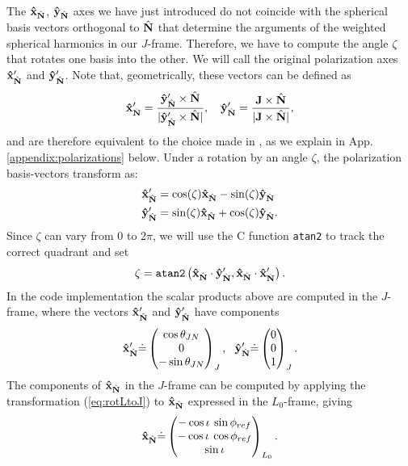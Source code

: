 \documentclass[%
aps,
prd,
amssymb,
amsmath,
amsfonts,
eqsecnum,
showpacs,
nofootinbib,
floatfix,
twocolumn,
twoside,
a4paper,
superscriptaddress
]{revtex4-1}
\newcommand{\x}{\mathbf{\hat{x}}}
\newcommand{\y}{\mathbf{\hat{y}}}
\newcommand{\hN}{{\hat{\bf{N}}}}
\newcommand{\J}{\mathbf{J}}
\begin{document}
The $\x_{\hN}$, $\y_{\hN}$ axes we have just introduced do not coincide with the spherical basis vectors orthogonal to $\hN$ that determine the arguments of the weighted spherical harmonics in our $J$-frame. Therefore, we have to compute the angle $\zeta$ that rotates one basis into the other. We will call the original  polarization axes $\x^{\prime}_{\hN}$ and $\y^{\prime}_{\hN}$. Note that, geometrically, these vectors can be defined as
\begin{align}
\x^{\prime}_{\hN}=\frac{\y^{\prime}_{\hN}\times \hN}{|\y^{\prime}_{\hN}\times \hN|},\ \ \ \y^{\prime}_{\hN}=\frac{\J\times \hN}{|\J\times \hN|},
\end{align}
and are therefore equivalent to the choice made in \cite{Kidder:1995zr}, as we explain in App.\,{\ref{appendix:polarizations}} below. Under a rotation by an angle $\zeta$, the polarization basis-vectors transform as:
\begin{subequations}
\label{eq:rotate_pol_basis}
\begin{align}
\x^{\prime}_{\hN}&=\cos({\zeta})\x_{\hN}-\sin({\zeta})\y_{\hN}\\
\y^{\prime}_{\hN}&=\sin({\zeta})\x_{\hN}+\cos({\zeta})\y_{\hN}.
\end{align}
\end{subequations}
%
Since $\zeta$ can vary from $0$ to $2\pi$, we will use the C function \texttt{atan2} to track the correct quadrant and set
\begin{equation}
    \zeta = \texttt{atan2} \left( \x_{\hN} \cdot \y^{\prime}_{\hN}, \x_{\hN} \cdot \x^{\prime}_{\hN}   \right).
\end{equation}
In the code implementation the scalar products above are computed in the $J$-frame, where the vectors $\x^{\prime}_{\hN}$ and $\y^{\prime}_{\hN}$ have components
\begin{equation}
    \x^{\prime}_{\hN} \dot= \begin{pmatrix}   \cos \theta_{JN}\\ 0\\ - \sin \theta_{JN} \end{pmatrix}_J, \:\:\:
    \y^{\prime}_{\hN} \dot= 
        \begin{pmatrix}  0\\0\\1\end{pmatrix}_J.
\end{equation}
The components of $\x_{\hN}$ in the $J$-frame can be computed by applying the transformation (\ref{eq:rotLtoJ}) to $\x_{\hN}$ expressed in the $L_0$-frame, giving 
\begin{equation}
 \x_{\hN} \dot= 
 \begin{pmatrix} - \cos \iota \:\sin \phi_{ref}\\ -\cos \iota \:\cos \phi_{ref} \\ \sin \iota\end{pmatrix}_{L_0}.
\end{equation}
\end{document}
